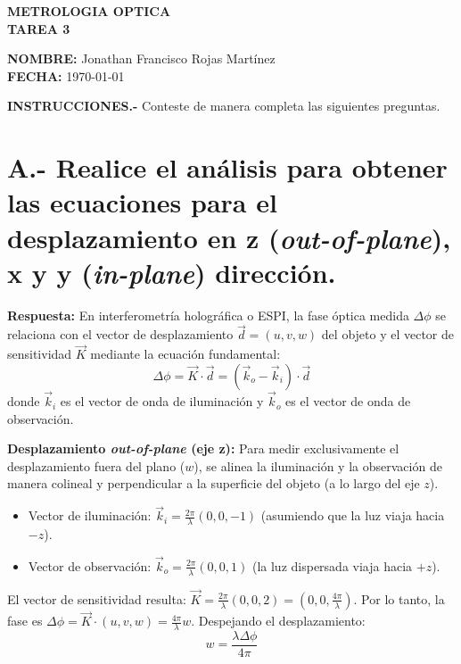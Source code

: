 \documentclass[12pt,letterpaper]{article}
\begin{document}
	
	\begin{center}
		\textbf{\Large METROLOGIA OPTICA} \\[0.3cm]
		\textbf{\large TAREA 3}
	\end{center}
	
	\vspace{0.5cm}
	\noindent \textbf{NOMBRE:} Jonathan Francisco Rojas Martínez \\
	\textbf{FECHA:} \today \vspace{0.5cm}
	
	\noindent \textbf{INSTRUCCIONES.-} Conteste de manera completa las siguientes preguntas.
	
	\vspace{0.8cm}
	\noindent \section*{A.- Realice el análisis para obtener las ecuaciones para el desplazamiento en z (\textit{out-of-plane}), x y y (\textit{in-plane}) dirección.}
	
	\textbf{Respuesta:}
	En interferometría holográfica o ESPI, la fase óptica medida $\Delta\phi$ se relaciona con el vector de desplazamiento $\vec{d} = (u, v, w)$ del objeto y el vector de sensitividad $\vec{K}$ mediante la ecuación fundamental:
	\[
	\Delta\phi = \vec{K} \cdot \vec{d} = (\vec{k}_o - \vec{k}_i) \cdot \vec{d}
	\]
	donde $\vec{k}_i$ es el vector de onda de iluminación y $\vec{k}_o$ es el vector de onda de observación.
	
	\textbf{Desplazamiento \textit{out-of-plane} (eje z):}
	Para medir exclusivamente el desplazamiento fuera del plano ($w$), se alinea la iluminación y la observación de manera colineal y perpendicular a la superficie del objeto (a lo largo del eje $z$).
	\begin{itemize}
		\item Vector de iluminación: $\vec{k}_i = \frac{2\pi}{\lambda}(0, 0, -1)$ (asumiendo que la luz viaja hacia $-z$).
		\item Vector de observación: $\vec{k}_o = \frac{2\pi}{\lambda}(0, 0, 1)$ (la luz dispersada viaja hacia $+z$).
	\end{itemize}
	El vector de sensitividad resulta: $\vec{K} = \frac{2\pi}{\lambda}(0, 0, 2) = (0, 0, \frac{4\pi}{\lambda})$.
	Por lo tanto, la fase es $\Delta\phi = \vec{K} \cdot (u, v, w) = \frac{4\pi}{\lambda} w$.
	Despejando el desplazamiento:
	\[
	w = \frac{\lambda \Delta\phi}{4\pi}
	\]
	
\end{document}
